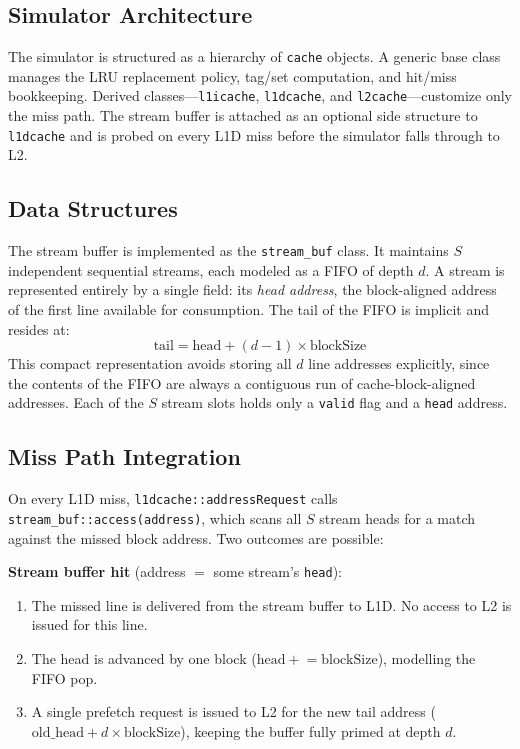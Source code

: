 \documentclass[10pt,twocolumn]{article}
\begin{document}
\subsection{Simulator Architecture}

The simulator is structured as a hierarchy of \texttt{cache} objects.
A generic base class manages the LRU replacement policy, tag/set
computation, and hit/miss bookkeeping. Derived classes---\texttt{l1icache},
\texttt{l1dcache}, and \texttt{l2cache}---customize only the miss path.
The stream buffer is attached as an optional side structure to
\texttt{l1dcache} and is probed on every L1D miss before the simulator
falls through to L2.

\subsection{Data Structures}

The stream buffer is implemented as the \texttt{stream\_buf} class. It
maintains $S$ independent sequential streams, each modeled as a FIFO of
depth $d$. A stream is represented entirely by a single field: its
\textit{head address}, the block-aligned address of the first line
available for consumption. The tail of the FIFO is implicit and resides
at:
\[
  \text{tail} = \text{head} + (d-1) \times \text{blockSize}
\]
This compact representation avoids storing all $d$ line addresses
explicitly, since the contents of the FIFO are always a contiguous
run of cache-block-aligned addresses. Each of the $S$ stream slots holds
only a \texttt{valid} flag and a \texttt{head} address.

\subsection{Miss Path Integration}

On every L1D miss, \texttt{l1dcache::addressRequest} calls
\texttt{stream\_buf::access(address)}, which scans all $S$ stream heads
for a match against the missed block address. Two outcomes are possible:

\textbf{Stream buffer hit} (address $=$ some stream's \texttt{head}):
\begin{enumerate}
  \item The missed line is delivered from the stream buffer to L1D.
    No access to L2 is issued for this line.
  \item The head is advanced by one block ($\text{head} \mathrel{+}=
    \text{blockSize}$), modelling the FIFO pop.
  \item A single prefetch request is issued to L2 for the new tail
    address ($\text{old\_head} + d \times \text{blockSize}$), keeping
    the buffer fully primed at depth $d$.
\end{enumerate}
\end{document}
